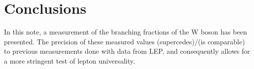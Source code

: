 \chapter{Conclusions}
\label{sec:empty}


In this note, a measurement of the branching fractions of the W boson
has been presented.  The precision of these measured values
(supercedes)/(is comparable) to previous measurements done with data
from LEP, and consequently allows for a more stringent test of lepton
universality.  